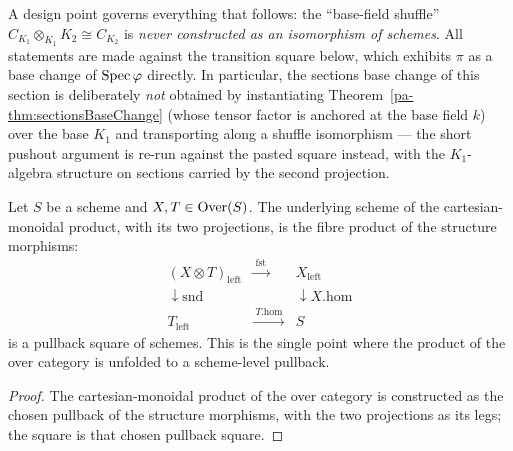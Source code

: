 A design point governs everything that follows: the ``base-field shuffle''
\(C_{K_1} \otimes_{K_1} K_2 \cong C_{K_2}\) is \emph{never constructed as an isomorphism
of schemes}. All statements are made against the transition square below, which exhibits
\(\pi\) as a base change of \(\operatorname{Spec}\varphi\) directly. In particular, the sections base
change of this section is deliberately \emph{not} obtained by instantiating
Theorem~\ref{pa-thm:sectionsBaseChange} (whose tensor factor is anchored at the base field
\(k\)) over the base \(K_1\) and transporting along a shuffle isomorphism --- the short
pushout argument is re-run against the pasted square instead, with the
\(K_1\)-algebra structure on sections carried by the second projection.

\begin{lemma}
  \label{pa-lem:over_isPullback_left}
  \leanok

  Let \(S\) be a scheme and \(X, T \in \mathrm{Over}(S)\). The underlying scheme of the
  cartesian-monoidal product, with its two projections, is the fibre product of the
  structure morphisms:
  \[
    \begin{array}{ccc}
      (X \otimes T)_{\mathrm{left}} & \xrightarrow{\ \mathrm{fst}\ } & X_{\mathrm{left}} \\
      \downarrow \mathrm{snd} & & \downarrow X.\mathrm{hom} \\
      T_{\mathrm{left}} & \xrightarrow{\ T.\mathrm{hom}\ } & S
    \end{array}
  \]
  is a pullback square of schemes. This is the single point where the product of the over
  category is unfolded to a scheme-level pullback.
\end{lemma}
\begin{proof}
  \leanok
  The cartesian-monoidal product of the over category is constructed as the chosen pullback
  of the structure morphisms, with the two projections as its legs; the square is that
  chosen pullback square.
\end{proof}

